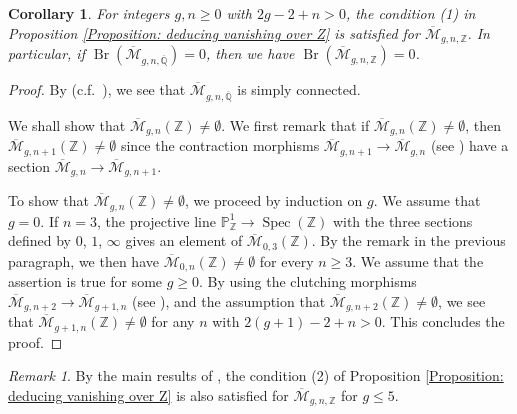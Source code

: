 \documentclass{amsart}
\newtheorem{cor}[prop]{Corollary}
\theoremstyle{definition}
\theoremstyle{remark}
\newtheorem{remark}[prop]{Remark}
\DeclareMathOperator{\Spec}{Spec}
\DeclareMathOperator{\Br}{Br}
\newcommand{\Q}{\mathbb{Q}}
\newcommand{\PP}{\mathbb P}
\newcommand{\ZZ}{\mathbb Z}
\begin{document}
\begin{cor}\label{Corollary: Brauer group of moduli spaces of curves over Z}
    For integers $g, n \geq 0$ with $2g-2+n > 0$,
    the condition (1) in Proposition \ref{Proposition: deducing vanishing over Z} is satisfied for $\overline{\mathcal{M}}_{g,n,\ZZ}.$
    In particular, if $\Br(\overline{\mathcal{M}}_{g, n, \overline{\Q}})=0$, then we have
    $\Br(\overline{\mathcal{M}}_{g,n,\ZZ})=0$.
\end{cor}

\begin{proof}
    By \cite[Proposition 1.1]{BoggiPikaartGaloisCovers} (c.f.\ \cite[Theorem 5.8]{fringuelli2023picardgroupschememoduli}),
    we see that
    $\overline{\mathcal{M}}_{g,n,\overline{\Q}}$
    is simply connected.
    
    We shall show that
    $\overline{\mathcal{M}}_{g,n}(\ZZ)\neq \emptyset$.
    We first remark that if
    $\overline{\mathcal{M}}_{g,n}(\ZZ)\neq \emptyset$, then $\overline{\mathcal{M}}_{g,n+1}(\ZZ)\neq \emptyset$
    since the contraction morphisms
    $\overline{\mathcal{M}}_{g,n+1} \to \overline{\mathcal{M}}_{g,n}$
    (see \cite[Section 2]{Knudsen}) have a section
    $\overline{\mathcal{M}}_{g,n} \to \overline{\mathcal{M}}_{g,n+1}$.
    
    To show that $\overline{\mathcal{M}}_{g,n}(\ZZ)\neq \emptyset$, we proceed by induction on $g$.
    We assume that $g=0$.
    If $n=3$, the projective line
    $\PP^1_{\ZZ} \to \Spec (\ZZ)$ with the three sections
    defined by $0$, $1$, $\infty$ gives an element of $\overline{\mathcal{M}}_{0,3}(\ZZ)$.
    By the remark in the previous paragraph, we then have 
    $\overline{\mathcal{M}}_{0,n}(\ZZ)\neq \emptyset$ for every $n \geq 3$.
    We assume that the assertion is true for some $g \geq 0$.
    By using the clutching morphisms
    $
    \overline{\mathcal{M}}_{g,n+2} \to \overline{\mathcal{M}}_{g+1,n}
    $
    (see \cite[Section 3]{Knudsen}), and the assumption that $\overline{\mathcal{M}}_{g,n+2}(\ZZ) \neq \emptyset$,
    we see that $\overline{\mathcal{M}}_{g+1,n}(\ZZ)\neq \emptyset$ for any $n$ with $2(g+1)-2+n > 0$.
    This concludes the proof.
\end{proof}

\begin{remark}\label{Remark:Constancy of Picard scheme of moduli space of stable curves}
    By the main results of \cite{fringuelli2023picardgroupschememoduli}, the condition (2) of Proposition \ref{Proposition: deducing vanishing over Z} is also satisfied for $\overline{\mathcal{M}}_{g,n,\ZZ}$ for $g\leq 5.$
\end{remark}
\end{document}
